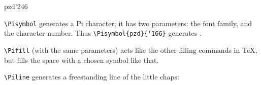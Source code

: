 \documentclass[11pt]{article}
\begin{document}
\begin{Pilist}{pzd}{'246}
\item \verb|\Pisymbol| generates a Pi character; it has two
parameters: the font family, and the character number. Thus
\verb|\Pisymbol{pzd}{'166}| generates .
\item \verb|\Pifill| (with the same parameters)
 acts like the  other filling commands in \TeX, but fills the
space with a chosen symbol  like that.
\item \verb|\Piline| generates a freestanding line of the little chaps:
\end{Pilist}
\end{document}
